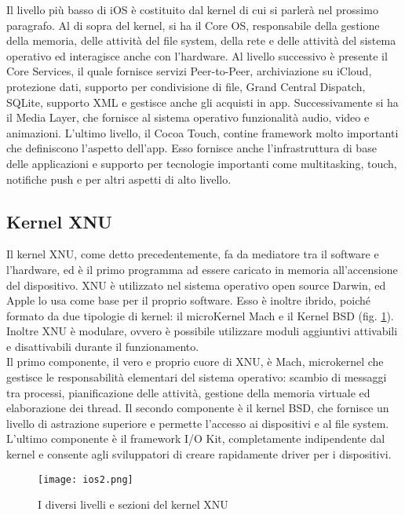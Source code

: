 Il livello più basso di iOS è costituito dal kernel di cui si parlerà nel
prossimo paragrafo. Al di sopra del kernel, si ha il Core OS,
responsabile della gestione della memoria, delle attività del file system, della
rete e delle attività del sistema operativo ed interagisce anche con l’hardware.
Al livello successivo è presente il Core Services, il quale fornisce servizi Peer-to-Peer,
archiviazione su iCloud, protezione dati, supporto per condivisione di file, Grand
Central Dispatch, SQLite, supporto XML e gestisce anche gli acquisti in app. Successivamente
si ha il Media Layer, che fornisce al sistema operativo funzionalità audio, video
e animazioni. L’ultimo livello, il Cocoa Touch, contine framework molto importanti
che definiscono l’aspetto dell’app. Esso fornisce anche l'infrastruttura di base delle
applicazioni e supporto per tecnologie importanti come multitasking, touch,
notifiche push e per altri aspetti di alto livello.

\subsection{Kernel XNU}
Il kernel XNU, come detto precedentemente, fa da mediatore tra il software
e l’hardware, ed è il primo programma ad essere caricato in memoria
all’accensione del dispositivo. XNU è utilizzato nel sistema operativo open source
Darwin, ed Apple lo usa come base per il proprio software. Esso è inoltre
ibrido, poiché formato da due tipologie di kernel: il microKernel Mach e il
Kernel BSD (fig. \ref{ios2}).
Inoltre XNU è modulare, ovvero è possibile utilizzare moduli aggiuntivi
attivabili e disattivabili durante il funzionamento. \\
Il primo componente, il vero e proprio cuore di XNU, è Mach, microkernel che gestisce le
responsabilità elementari del sistema operativo: scambio di messaggi tra
processi, pianificazione delle attività, gestione della memoria virtuale ed
elaborazione dei thread. Il secondo componente è il kernel BSD, che fornisce un
livello di astrazione superiore e permette l’accesso ai dispositivi e al file
system. L’ultimo componente è il framework I/O Kit, completamente indipendente
dal kernel e consente agli sviluppatori di creare rapidamente driver per i
dispositivi. \\
\begin{figure}[!h]
    \centering
    \texttt{[image: ios2.png]}
    \caption{I diversi livelli e sezioni del kernel XNU}
    \label{ios2}
\end{figure}


